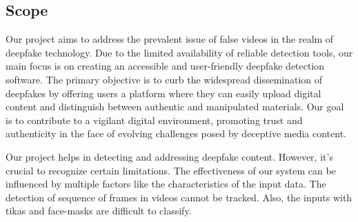 \subsection{Scope}

Our project aims to address the prevalent issue of false videos in the realm of deepfake technology. Due to the limited availability of reliable detection tools, our main focus is on creating an accessible and user-friendly deepfake detection software. The primary objective is to curb the widespread dissemination of deepfakes by offering users a platform where they can easily upload digital content and distinguish between authentic and manipulated materials. Our goal is to contribute to a vigilant digital environment, promoting trust and authenticity in the face of evolving challenges posed by deceptive media content.

\noindent Our project helps in detecting and addressing deepfake content. However, it's crucial to recognize certain limitations. The effectiveness of our system  can be influenced by multiple factors like the characteristics of the input data. The detection of sequence of frames in videos cannot be tracked. Also, the inputs with tikas and face-masks are difficult to classify.
